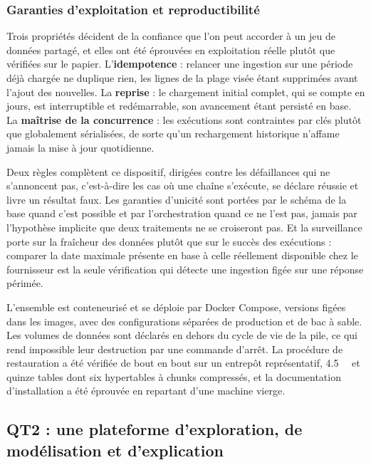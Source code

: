 \subsubsection{Garanties d'exploitation et reproductibilité}

Trois propriétés décident de la confiance que l'on peut accorder à un jeu de données partagé, et elles ont été éprouvées en exploitation réelle plutôt que vérifiées sur le papier. L'\textbf{idempotence} : relancer une ingestion sur une période déjà chargée ne duplique rien, les lignes de la plage visée étant supprimées avant l'ajout des nouvelles. La \textbf{reprise} : le chargement initial complet, qui se compte en jours, est interruptible et redémarrable, son avancement étant persisté en base. La \textbf{maîtrise de la concurrence} : les exécutions sont contraintes par clés plutôt que globalement sérialisées, de sorte qu'un rechargement historique n'affame jamais la mise à jour quotidienne.

Deux règles complètent ce dispositif, dirigées contre les défaillances qui ne s'annoncent pas, c'est-à-dire les cas où une chaîne s'exécute, se déclare réussie et livre un résultat faux. Les garanties d'unicité sont portées par le schéma de la base quand c'est possible et par l'orchestration quand ce ne l'est pas, jamais par l'hypothèse implicite que deux traitements ne se croiseront pas. Et la surveillance porte sur la fraîcheur des données plutôt que sur le succès des exécutions : comparer la date maximale présente en base à celle réellement disponible chez le fournisseur est la seule vérification qui détecte une ingestion figée sur une réponse périmée.

L'ensemble est conteneurisé et se déploie par Docker Compose, versions figées dans les images, avec des configurations séparées de production et de bac à sable. Les volumes de données sont déclarés en dehors du cycle de vie de la pile, ce qui rend impossible leur destruction par une commande d'arrêt. La procédure de restauration a été vérifiée de bout en bout sur un entrepôt représentatif, \SI{4,5}{\giga\byte} et quinze tables dont six hypertables à chunks compressés, et la documentation d'installation a été éprouvée en repartant d'une machine vierge.

\subsection{QT2 : une plateforme d'exploration, de modélisation et d'explication}

